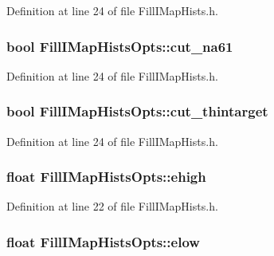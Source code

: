 Definition at line 24 of file Fill\-I\-Map\-Hists.\-h.

\hypertarget{struct_fill_i_map_hists_opts_a329f41d35300df826b6e5175999292c7}{
\subsubsection[{cut\-\_\-na61}]{\setlength{\rightskip}{0pt plus 5cm}bool Fill\-I\-Map\-Hists\-Opts\-::cut\-\_\-na61}}\label{struct_fill_i_map_hists_opts_a329f41d35300df826b6e5175999292c7}


Definition at line 24 of file Fill\-I\-Map\-Hists.\-h.

\hypertarget{struct_fill_i_map_hists_opts_a8824fb5df1a05cd23d9ea2bd99c48aab}{
\subsubsection[{cut\-\_\-thintarget}]{\setlength{\rightskip}{0pt plus 5cm}bool Fill\-I\-Map\-Hists\-Opts\-::cut\-\_\-thintarget}}\label{struct_fill_i_map_hists_opts_a8824fb5df1a05cd23d9ea2bd99c48aab}


Definition at line 24 of file Fill\-I\-Map\-Hists.\-h.

\hypertarget{struct_fill_i_map_hists_opts_a8686a1f088c28200c625677dbf76923b}{
\subsubsection[{ehigh}]{\setlength{\rightskip}{0pt plus 5cm}float Fill\-I\-Map\-Hists\-Opts\-::ehigh}}\label{struct_fill_i_map_hists_opts_a8686a1f088c28200c625677dbf76923b}


Definition at line 22 of file Fill\-I\-Map\-Hists.\-h.

\hypertarget{struct_fill_i_map_hists_opts_aedcac42eb1b9095b1fbd1e3dbf9192a8}{
\subsubsection[{elow}]{\setlength{\rightskip}{0pt plus 5cm}float Fill\-I\-Map\-Hists\-Opts\-::elow}}\label{struct_fill_i_map_hists_opts_aedcac42eb1b9095b1fbd1e3dbf9192a8}


